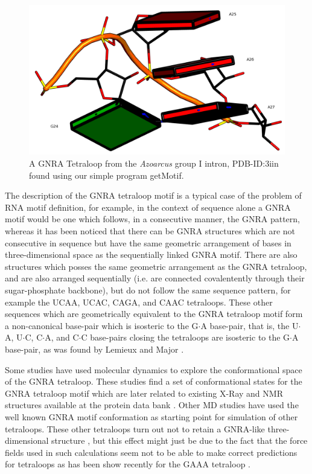 \begin{figure}
\centering
\includegraphics[angle=0, scale=2]{Chapter5/gnra24.png}
\caption{A GNRA Tetraloop from the \textit{Azoarcus} group I intron,
  PDB-ID:3iin  \cite{antonioli2010}  found  using our  simple  program
  getMotif.}
\label{fig:gnrablocks}
\end{figure}


The description of  the GNRA tetraloop motif is a  typical case of the
problem  of RNA  motif  definition,  for example,  in  the context  of
sequence  alone  a  GNRA  motif  would  be one  which  follows,  in  a
consecutive manner, the GNRA pattern, whereas it has been noticed that
there can be GNRA structures which are not consecutive in sequence but
have  the same  geometric  arrangement of  bases in  three-dimensional
space  as  the  sequentially   linked  GNRA  motif.   There  are  also
structures  which posses the  same geometric  arrangement as  the GNRA
tetraloop, and are also arranged sequentially (i.e.  are connected
covalentently  through  their sugar-phosphate  backbone),  but do  not
follow the  same sequence pattern,  for example the UCAA,  UCAC, CAGA,
and  CAAC tetraloops\cite{lemieux2006}.   These other  sequences which
are  geometrically  equivalent to  the  GNRA  tetraloop  motif form  a
non-canonical base-pair which is isosteric to the G$\cdot$A base-pair,
that is, the U$\cdot$A, U$\cdot$C, C$\cdot$A, and C$\cdot$C base-pairs
closing the  tetraloops are isosteric  to the G$\cdot$A  base-pair, as
was found by Lemieux and Major \cite{lemieux2006}.

Some   studies   have  used   molecular   dynamics   to  explore   the
conformational space of  the GNRA tetraloop. These studies  find a set
of conformational states for the  GNRA tetraloop motif which are later
related to existing X-Ray and  NMR structures available at the protein
data bank \cite{depaul2010, sorin2002}. Other MD studies have used the
well known GNRA motif conformation as starting point for simulation of
other tetraloops.   These other  tetraloops turn out  not to  retain a
GNRA-like three-dimensional  structure \cite{srinivasan1998}, but this
effect might  just be due  to the fact  that the force fields  used in
such  calculations \cite{cornell1995}  seem  not to  be  able to  make
correct predictions for  tetraloops as has been show  recently for the
GAAA tetraloop \cite{spackova2010}.

